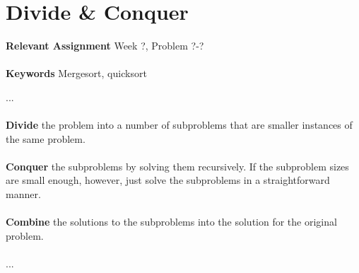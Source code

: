 
\chapter{Divide \& Conquer}
\label{ch:divideandconquer}

\textbf{Relevant Assignment} Week ?, Problem ?-?\\\\
\textbf{Keywords} Mergesort, quicksort
\vspace{1in}

\noindent ...
\\\\
\noindent \textbf{Divide} the problem into a number of subproblems that are
smaller instances of the same problem.
\\\\
\noindent \textbf{Conquer} the subproblems by solving them recursively. If the
subproblem sizes are small enough, however, just solve the subproblems in a
straightforward manner.
\\\\
\noindent \textbf{Combine} the solutions to the subproblems into the solution
for the original problem.
\\\\
...

